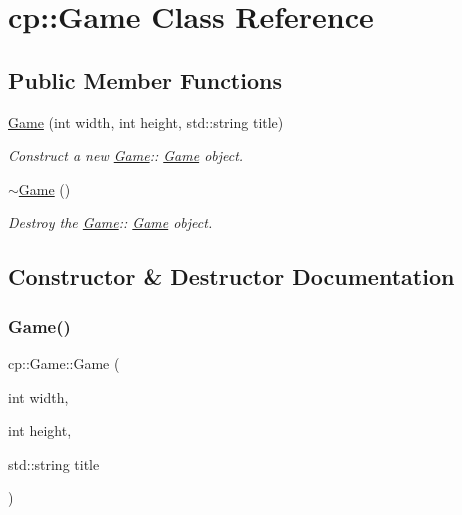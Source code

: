 \hypertarget{classcp_1_1_game}{}\section{cp\+:\+:Game Class Reference}
\label{classcp_1_1_game}
\subsection*{Public Member Functions}
\begin{DoxyCompactItemize}
\item 
\hyperlink{classcp_1_1_game_a3ae35e3d273bca248b415b9acb5b2010}{Game} (int width, int height, std\+::string title)
\begin{DoxyCompactList}\small\item\em Construct a new \hyperlink{classcp_1_1_game}{Game}\+:\+: \hyperlink{classcp_1_1_game}{Game} object. \end{DoxyCompactList}\item 
\mbox{\label{classcp_1_1_game_a1c1387e83a2325e45cbf2099c430c502}} 
\hyperlink{classcp_1_1_game_a1c1387e83a2325e45cbf2099c430c502}{$\sim$\+Game} ()
\begin{DoxyCompactList}\small\item\em Destroy the \hyperlink{classcp_1_1_game}{Game}\+:\+: \hyperlink{classcp_1_1_game}{Game} object. \end{DoxyCompactList}\end{DoxyCompactItemize}


\subsection{Constructor \& Destructor Documentation}
\mbox{\label{classcp_1_1_game_a3ae35e3d273bca248b415b9acb5b2010}} 
\subsubsection{\texorpdfstring{Game()}{Game()}}
{\footnotesize\ttfamily cp\+::\+Game\+::\+Game (\begin{DoxyParamCaption}\item[{int}]{width,  }\item[{int}]{height,  }\item[{std\+::string}]{title }\end{DoxyParamCaption})}



